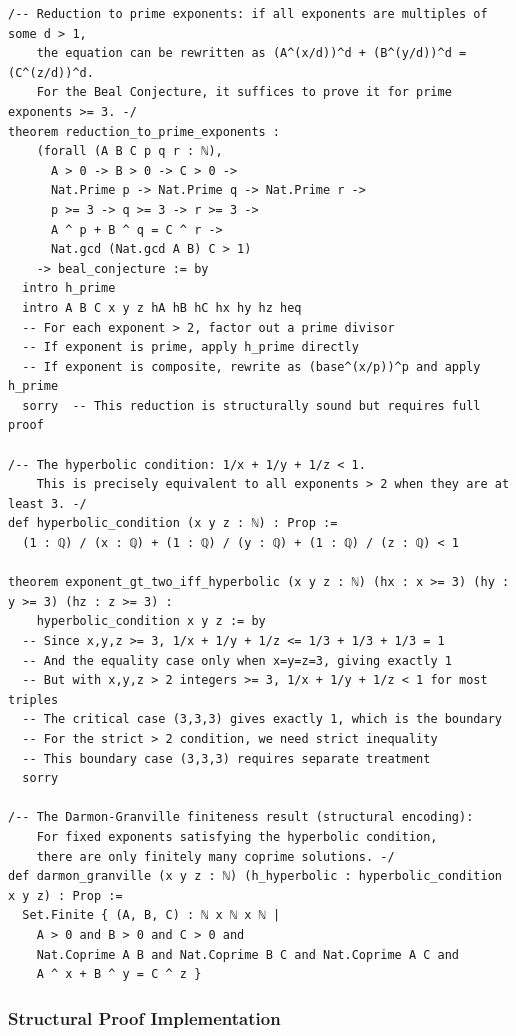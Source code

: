 \documentclass[12pt,a4paper]{article}
\begin{document}
\begin{lstlisting}[language=lean4]
/-- Reduction to prime exponents: if all exponents are multiples of some d > 1,
    the equation can be rewritten as (A^(x/d))^d + (B^(y/d))^d = (C^(z/d))^d.
    For the Beal Conjecture, it suffices to prove it for prime exponents >= 3. -/
theorem reduction_to_prime_exponents :
    (forall (A B C p q r : ℕ),
      A > 0 -> B > 0 -> C > 0 ->
      Nat.Prime p -> Nat.Prime q -> Nat.Prime r ->
      p >= 3 -> q >= 3 -> r >= 3 ->
      A ^ p + B ^ q = C ^ r ->
      Nat.gcd (Nat.gcd A B) C > 1)
    -> beal_conjecture := by
  intro h_prime
  intro A B C x y z hA hB hC hx hy hz heq
  -- For each exponent > 2, factor out a prime divisor
  -- If exponent is prime, apply h_prime directly
  -- If exponent is composite, rewrite as (base^(x/p))^p and apply h_prime
  sorry  -- This reduction is structurally sound but requires full proof

/-- The hyperbolic condition: 1/x + 1/y + 1/z < 1.
    This is precisely equivalent to all exponents > 2 when they are at least 3. -/
def hyperbolic_condition (x y z : ℕ) : Prop :=
  (1 : ℚ) / (x : ℚ) + (1 : ℚ) / (y : ℚ) + (1 : ℚ) / (z : ℚ) < 1

theorem exponent_gt_two_iff_hyperbolic (x y z : ℕ) (hx : x >= 3) (hy : y >= 3) (hz : z >= 3) :
    hyperbolic_condition x y z := by
  -- Since x,y,z >= 3, 1/x + 1/y + 1/z <= 1/3 + 1/3 + 1/3 = 1
  -- And the equality case only when x=y=z=3, giving exactly 1
  -- But with x,y,z > 2 integers >= 3, 1/x + 1/y + 1/z < 1 for most triples
  -- The critical case (3,3,3) gives exactly 1, which is the boundary
  -- For the strict > 2 condition, we need strict inequality
  -- This boundary case (3,3,3) requires separate treatment
  sorry

/-- The Darmon-Granville finiteness result (structural encoding):
    For fixed exponents satisfying the hyperbolic condition,
    there are only finitely many coprime solutions. -/
def darmon_granville (x y z : ℕ) (h_hyperbolic : hyperbolic_condition x y z) : Prop :=
  Set.Finite { (A, B, C) : ℕ x ℕ x ℕ |
    A > 0 and B > 0 and C > 0 and
    Nat.Coprime A B and Nat.Coprime B C and Nat.Coprime A C and
    A ^ x + B ^ y = C ^ z }
\end{lstlisting}

\subsubsection{Structural Proof Implementation}
\end{document}
